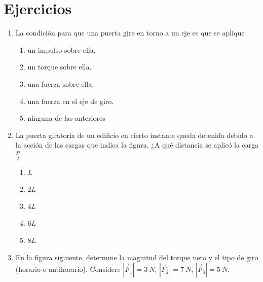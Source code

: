\documentclass[letterpaper]{article}
\newenvironment{enumalf}
{\begin{enumerate}[label=\Alph*)]}
{\end{enumerate}}
\begin{document}
\section*{Ejercicios}

\begin{enumerate}

\item La condición para que una puerta gire en torno a un eje es que se aplique

\begin{enumerate}[label=\Alph*)]
\item un impulso sobre ella.
\item un torque sobre ella.
\item una fuerza sobre ella.
\item una fuerza en el eje de giro.
\item ninguna de las anteriores
\end{enumerate}

\item La puerta giratoria de un edificio en cierto instante queda detenida debido a la acción de las cargas que indica la figura. ¿A qué distancia se aplicó la carga $\frac{P}{2}$

\begin{figure}[h]
\centering
{}
\end{figure}

\begin{enumalf}
\item $L$
\item $2L$
\item $4L$
\item $6L$
\item $8L$
\end{enumalf}

\pagebreak

\item En la figura siguiente, determine la magnitud del torque neto y el tipo de giro (horario o antihorario). Considere $|\vec{F}_1| = 3\ \si{N}$, $|\vec{F}_2| = 7\ \si{N}$, $|\vec{F}_3| = 5\ \si{N}$.


\end{enumerate}
\end{document}
